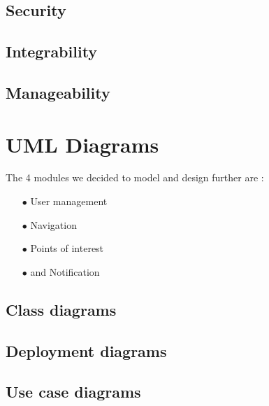 \documentclass[english]{article}
\begin{document}
	\subsection{Security}
	\subsection{Integrability}
	\subsection{Manageability}
		
	\section{UML Diagrams}
	The 4 modules we decided to model and design further are :
	\begin{itemize}
		\item[$\bullet$] User management
		\item[$\bullet$] Navigation
		\item[$\bullet$] Points of interest
		\item[$\bullet$] and Notification
	\end{itemize}
		\subsection{Class diagrams}
		\subsection{Deployment diagrams}
		\subsection{Use case diagrams}	
	
		
		
		
			
	
		
\end{document}
